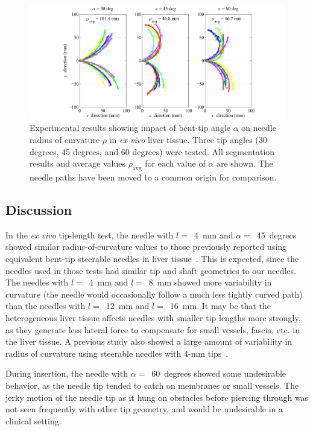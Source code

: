 \begin{figure}[!ht]
\centering
\includegraphics[width=\textwidth]{Images/Chapter3/CurvatureVsAngle/CurvatureVsAngleData}%
\caption[Experimental results showing impact of bent-tip angle]{Experimental results showing impact of bent-tip angle $\alpha$ on needle radius of curvature $\rho$ in \textit{ex vivo} liver tissue. Three tip angles (30 degrees, 45 degrees, and 60 degrees) were tested. All segmentation results and average values $\rho_{\text{avg}}$ for each value of $\alpha$ are shown. The needle paths have been moved to a common origin for comparison.}
\label{fig:CurvatureVsAngleData}
\end{figure}

\subsection{Discussion}
In the \textit{ex vivo} tip-length test, the needle with $l =$~4~mm and $\alpha =$~45~degrees showed similar radius-of-curvature values to those previously reported using equivalent bent-tip steerable needles in liver tissue~\cite{Patil2014,Swaney2013}. This is expected, since the needles used in those tests had similar tip and shaft geometries to our needles. The needles with $l =$~4~mm and $l =$~8~mm showed more variability in curvature (the needle would occasionally follow a much less tightly curved path) than the needles with $l =$~12~mm and $l =$~16~mm. It may be that the heterogeneous liver tissue affects needles with smaller tip lengths more strongly, as they generate less lateral force to compensate for small vessels, fascia, etc. in the liver tissue. A previous study also showed a large amount of variability in radius of curvature using steerable needles with 4-mm tips~\cite{Majewicz2010}.

During insertion, the needle with $\alpha =$~60~degrees showed some undesirable behavior, as the needle tip tended to catch on membranes or small vessels. The jerky motion of the needle tip as it hung on obstacles before piercing through was not seen frequently with other tip geometry, and would be undesirable in a clinical setting.

